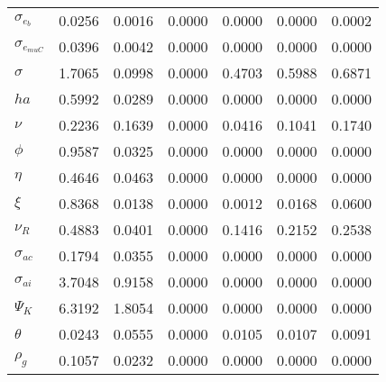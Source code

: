 \begin{center}
\begin{longtable}{lcccccc}
$ \sigma_{{e_b}}       $	 & 	          0.0256	 & 	          0.0016	 & 	          0.0000	 & 	          0.0000	 & 	          0.0000	 & 	          0.0002 \\ 
$ \sigma_{{e_{muC}}}   $	 & 	          0.0396	 & 	          0.0042	 & 	          0.0000	 & 	          0.0000	 & 	          0.0000	 & 	          0.0000 \\ 
$ {\sigma}             $	 & 	          1.7065	 & 	          0.0998	 & 	          0.0000	 & 	          0.4703	 & 	          0.5988	 & 	          0.6871 \\ 
$ {ha}                 $	 & 	          0.5992	 & 	          0.0289	 & 	          0.0000	 & 	          0.0000	 & 	          0.0000	 & 	          0.0000 \\ 
$ \nu                  $	 & 	          0.2236	 & 	          0.1639	 & 	          0.0000	 & 	          0.0416	 & 	          0.1041	 & 	          0.1740 \\ 
$ {\phi}               $	 & 	          0.9587	 & 	          0.0325	 & 	          0.0000	 & 	          0.0000	 & 	          0.0000	 & 	          0.0000 \\ 
$ {\eta}               $	 & 	          0.4646	 & 	          0.0463	 & 	          0.0000	 & 	          0.0000	 & 	          0.0000	 & 	          0.0000 \\ 
$ \xi                  $	 & 	          0.8368	 & 	          0.0138	 & 	          0.0000	 & 	          0.0012	 & 	          0.0168	 & 	          0.0600 \\ 
$ {\nu_R}              $	 & 	          0.4883	 & 	          0.0401	 & 	          0.0000	 & 	          0.1416	 & 	          0.2152	 & 	          0.2538 \\ 
$ {\sigma_{ac}}        $	 & 	          0.1794	 & 	          0.0355	 & 	          0.0000	 & 	          0.0000	 & 	          0.0000	 & 	          0.0000 \\ 
$ {\sigma_{ai}}        $	 & 	          3.7048	 & 	          0.9158	 & 	          0.0000	 & 	          0.0000	 & 	          0.0000	 & 	          0.0000 \\ 
$ {\Psi_{K}}           $	 & 	          6.3192	 & 	          1.8054	 & 	          0.0000	 & 	          0.0000	 & 	          0.0000	 & 	          0.0000 \\ 
$ {\theta}             $	 & 	          0.0243	 & 	          0.0555	 & 	          0.0000	 & 	          0.0105	 & 	          0.0107	 & 	          0.0091 \\ 
$ {\rho_g}             $	 & 	          0.1057	 & 	          0.0232	 & 	          0.0000	 & 	          0.0000	 & 	          0.0000	 & 	          0.0000 \\ 

\end{longtable}
\end{center}
